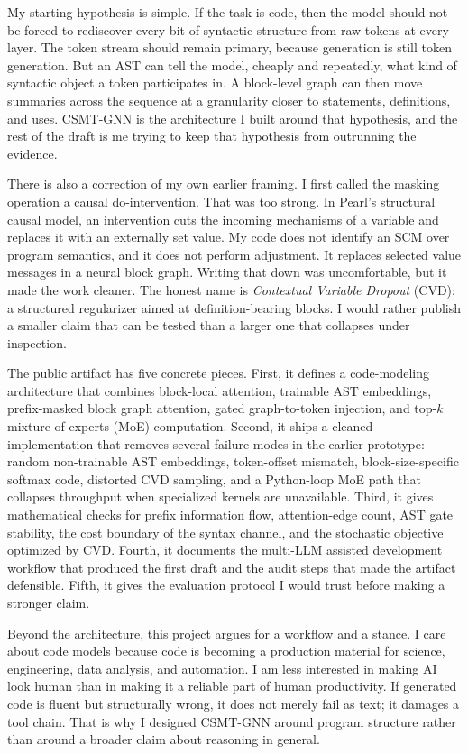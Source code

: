 \documentclass[10pt]{article}
\begin{document}
My starting hypothesis is simple.  If the task is code, then the model should
not be forced to rediscover every bit of syntactic structure from raw tokens at
every layer.  The token stream should remain primary, because generation is
still token generation.  But an AST can tell the model, cheaply and repeatedly,
what kind of syntactic object a token participates in.  A block-level graph can
then move summaries across the sequence at a granularity closer to statements,
definitions, and uses.  CSMT-GNN is the architecture I built around that
hypothesis, and the rest of the draft is me trying to keep that hypothesis from
outrunning the evidence.

There is also a correction of my own earlier framing.  I first
called the masking operation a causal do-intervention.  That was too strong.  In
Pearl's structural causal model, an intervention cuts the incoming mechanisms of
a variable and replaces it with an externally set value.  My code does not
identify an SCM over program semantics, and it does not perform adjustment.  It
replaces selected value messages in a neural block graph.  Writing that down was
uncomfortable, but it made the work cleaner.  The honest name is
\emph{Contextual Variable Dropout} (CVD): a structured regularizer aimed at
definition-bearing blocks.  I would rather publish a smaller claim that can be
tested than a larger one that collapses under inspection.

The public artifact has five concrete pieces.  First, it defines a code-modeling
architecture that combines block-local attention, trainable AST embeddings,
prefix-masked block graph attention, gated graph-to-token injection, and
top-$k$ mixture-of-experts (MoE) computation.  Second, it ships a cleaned
implementation that removes several failure modes in the earlier prototype:
random non-trainable AST embeddings, token-offset mismatch, block-size-specific
softmax code, distorted CVD sampling, and a Python-loop MoE path that collapses
throughput when specialized kernels are unavailable.  Third, it gives
mathematical checks for prefix information flow, attention-edge count, AST gate
stability, the cost boundary of the syntax channel, and the stochastic objective
optimized by CVD.  Fourth, it documents the multi-LLM assisted development
workflow that produced the first draft and the audit steps that made the
artifact defensible.  Fifth, it gives the evaluation protocol I would trust
before making a stronger claim.

Beyond the architecture, this project argues for a workflow and a stance.  I care about code models
because code is becoming a production material for science, engineering, data
analysis, and automation.  I am less interested in making AI look human than in
making it a reliable part of human productivity.  If generated code is fluent
but structurally wrong, it does not merely fail as text; it damages a tool
chain.  That is why I designed CSMT-GNN around program structure rather than
around a broader claim about reasoning in general.
\end{document}

